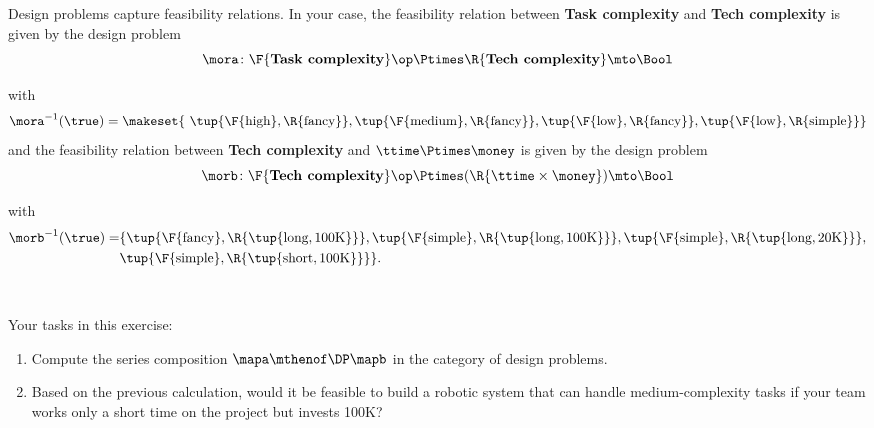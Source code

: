 \begin{gradedexercise}
    Design problems capture feasibility relations.
    In your case, the feasibility relation between \textbf{Task complexity} and \textbf{Tech complexity} is given by the design problem
    \begin{equation}
        \mora\colon \F{\textbf{Task complexity}}\op \Ptimes \R{\textbf{Tech complexity}} \mto \Bool
    \end{equation}
    \begin{center}
    \end{center}
    with
    \begin{equation*}
        \mora^{-1}(\true) = \makeset{ \ \tup{\F{\text{high} }, \R{ \text{fancy} }}, \tup{\F{\text{medium} }, \R{ \text{fancy} }}, \tup{\F{\text{low} }, \R{ \text{fancy} }}, \tup{\F{\text{low} }, \R{ \text{simple} }}}
    \end{equation*}
    and the feasibility relation between \textbf{Tech complexity} and $\ttime \Ptimes \money$ is given by the design problem
    \begin{equation}
        \morb \colon \F{\textbf{Tech complexity}}\op \Ptimes (\R{\ttime \times \money}) \mto \Bool
    \end{equation}
    \begin{center}
    \end{center}
    with
    \begin{align*}
        \morb^{-1}(\true) = & \{ \tup{\F{\text{fancy} }, \R{ \tup{\text{long}, \text{100K}} }}, \tup{\F{\text{simple} }, \R{ \tup{\text{long}, \text{100K}} }}, \tup{\F{\text{simple} }, \R{ \tup{\text{long}, \text{20K}} }}, \\
                            & \tup{\F{\text{simple} }, \R{ \tup{\text{short}, \text{100K}} }} \}.
    \end{align*}

    \

    Your tasks in this exercise:
    \begin{enumerate}
        \item Compute the series composition $\mapa \mthenof\DP \mapb$ in the category of design problems.
        \item Based on the previous calculation, would it be feasible to build a robotic system that can handle medium-complexity tasks if your team works only a short time on the project but invests 100K?
    \end{enumerate}
\end{gradedexercise}

